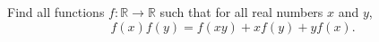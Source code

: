 Find all functions $f:\mathbb R\to\mathbb R$ such that for all real numbers $x$ and $y$,
\[f(x)f(y)=f(xy)+xf(y)+yf(x).\]

